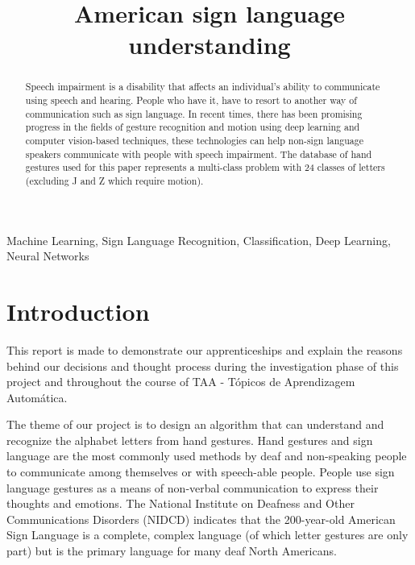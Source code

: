 \documentclass[conference]{IEEEtran}
\begin{document}
\title{American sign language understanding\\}

\author{
\and
{}
}

\maketitle

\begin{abstract}
Speech impairment is a disability that affects an individual’s ability to communicate using speech and hearing. People who have it, have to resort to another way of communication such as sign language. In recent times, there has been promising progress in the fields of gesture recognition and motion using deep learning and computer vision-based techniques, these technologies can help non-sign language speakers communicate with people with speech impairment. The database of hand gestures used for this paper represents a multi-class problem with 24 classes of letters (excluding J and Z which require motion).
\end{abstract}
\begin{IEEEkeywords}
Machine Learning, Sign Language Recognition, Classification, Deep Learning, Neural Networks
\end{IEEEkeywords}


\section{Introduction}
This report is made to demonstrate our apprenticeships and explain the reasons behind our decisions and thought process during the investigation phase of this project and throughout the course of TAA - Tópicos de Aprendizagem Automática.

The theme of our project is to design an algorithm that can understand and recognize the alphabet letters from hand gestures. Hand gestures and sign language are the most commonly used methods by deaf and non-speaking people to communicate among themselves or with speech-able people. People use sign language gestures as a means of non-verbal communication to express their thoughts and emotions. The National Institute on Deafness and Other Communications Disorders (NIDCD) indicates that the 200-year-old American Sign Language is a complete, complex language (of which letter gestures are only part) but is the primary language for many deaf North Americans. 
\end{document}
